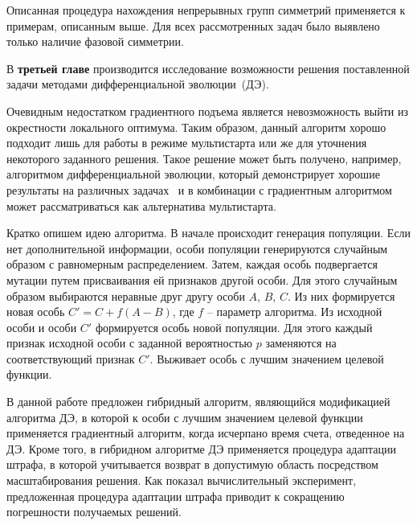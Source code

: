 
Описанная процедура нахождения непрерывных групп симметрий применяется к примерам, описанным выше. Для всех рассмотренных задач было выявлено только наличие фазовой симметрии.

В {\textbf{третьей главе}} производится исследование возможности решения поставленной задачи методами дифференциальной эволюции~(ДЭ).

Очевидным недостатком градиентного подъема является невозможность выйти из окрестности локального оптимума. Таким образом, данный алгоритм хорошо подходит лишь для работы в режиме мультистарта или же для уточнения некоторого заданного решения. Такое решение может быть получено, например, алгоритмом дифференциальной эволюции, который  демонстрирует хорошие результаты на различных задачах~ и в комбинации с градиентным алгоритмом может рассматриваться как альтернатива мультистарта.

Кратко опишем идею алгоритма. В начале происходит генерация популяции. Если нет дополнительной информации, особи популяции генерируются случайным образом с равномерным распределением. Затем, каждая особь подвергается мутации путем присваивания ей признаков другой особи.
Для этого случайным образом выбираются неравные друг другу особи $A$, $B$, $C$. Из них формируется новая особь $C' = C + f(A - B)$, где $f$ -- параметр алгоритма. Из исходной особи и особи $C'$ формируется особь новой популяции. Для этого каждый признак исходной особи с заданной вероятностью $p$ заменяются на соответствующий признак $C'$. Выживает особь с лучшим значением целевой функции.

В данной работе предложен гибридный алгоритм, являющийся  модификацией алгоритма ДЭ, в которой к особи с лучшим значением целевой функции применяется градиентный алгоритм, когда
исчерпано время счета, отведенное на ДЭ.
Кроме того, в гибридном алгоритме ДЭ применяется процедура адаптации штрафа, в которой учитывается возврат в допустимую область посредством масштабирования решения. Как показал вычислительный эксперимент, предложенная процедура адаптации штрафа приводит к сокращению погрешности получаемых решений.



